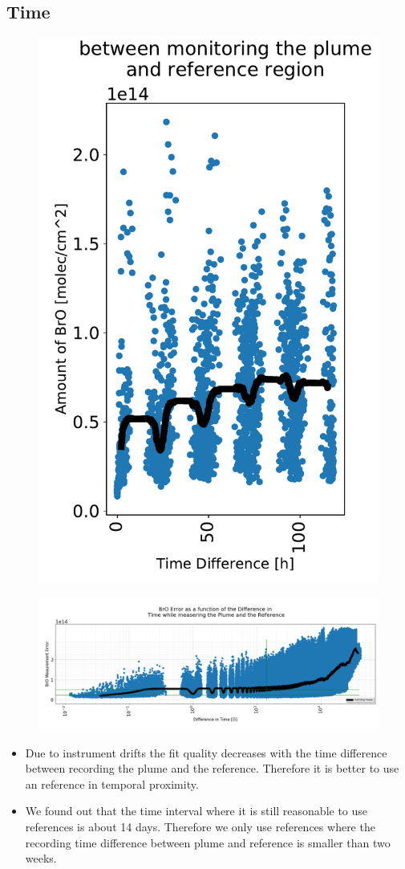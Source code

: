 \documentclass  [
  paper    = a4,
  BCOR     = 10mm,
  twoside,
  fontsize = 12pt,
  fleqn,
  toc      = bibnumbered,
  toc      = listofnumbered,
  numbers  = noendperiod,
  headings = normal,
  listof   = leveldown,
  version  = 3.03
]                                       {scrreprt}
\begin{document}
	
	\subsection{Time}
	\begin{figure}
		\centering
		\includegraphics[width=0.7\linewidth]{Bilder/Datum_100h}
		\caption{}
		\label{fig:datum100h}
	\end{figure}
	
	\begin{figure}[h!]
		\includegraphics[width=1.1\linewidth]{Bilder/Datum}
		\caption{}
		\label{fig:dat}
	\end{figure}
	\begin{itemize}
		\item Due to instrument drifts the fit quality decreases with the time difference between recording the plume and the reference. Therefore it is better to use an reference in temporal proximity.
		\item We found out that the time interval where it is still reasonable to use references is about 14 days. Therefore we only use references where the recording time difference between plume and reference is smaller than two weeks.
	\end{itemize}
\end{document}
